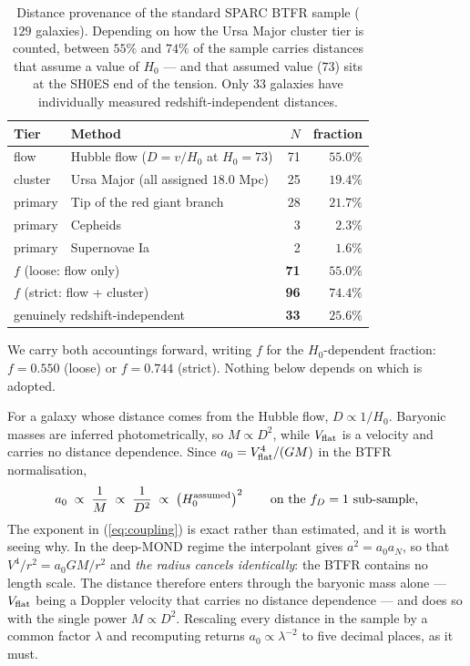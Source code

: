 \documentclass[11pt,a4paper]{article}
\begin{document}
\begin{table}[h]
\centering
\begin{tabular}{llrr}
\toprule
Tier & Method & $N$ & fraction \\
\midrule
flow    & Hubble flow ($D = v/H_0$ at $H_0 = 73$) & 71 & $55.0\%$ \\
cluster & Ursa Major (all assigned $18.0$ Mpc)    & 25 & $19.4\%$ \\
primary & Tip of the red giant branch             & 28 & $21.7\%$ \\
primary & Cepheids                                &  3 & $2.3\%$ \\
primary & Supernovae Ia                           &  2 & $1.6\%$ \\
\midrule
\multicolumn{2}{l}{$f$ (loose: flow only)}        & \textbf{71} & $\mathbf{55.0\%}$ \\
\multicolumn{2}{l}{$f$ (strict: flow + cluster)}  & \textbf{96} & $\mathbf{74.4\%}$ \\
\multicolumn{2}{l}{genuinely redshift-independent} & \textbf{33} & $25.6\%$ \\
\bottomrule
\end{tabular}
\caption{Distance provenance of the standard SPARC BTFR sample ($129$
galaxies). Depending on how the Ursa Major cluster tier is counted, between
$55\%$ and $74\%$ of the sample carries distances that assume a value of
$H_0$ --- and that assumed value ($73$) sits at the SH0ES end of the
tension. Only $33$ galaxies have individually measured redshift-independent
distances.}
\label{tab:fD}
\end{table}

We carry both accountings forward, writing $f$ for the $H_0$-dependent
fraction: $f = 0.550$ (loose) or $f = 0.744$ (strict). Nothing below depends
on which is adopted.

For a galaxy whose distance comes from the Hubble flow, $D \propto 1/H_0$.
Baryonic masses are inferred photometrically, so $M \propto D^2$, while
$V_{\rm flat}$ is a velocity and carries no distance dependence. Since
$a_0 = V_{\rm flat}^4/(GM)$ in the BTFR normalisation,
\begin{equation}
a_0 \;\propto\; \frac{1}{M} \;\propto\; \frac{1}{D^2}
\;\propto\; \left(H_0^{\rm assumed}\right)^{2}
\qquad \text{on the } f_D = 1 \text{ sub-sample,}
\label{eq:coupling}
\end{equation}
The exponent in (\ref{eq:coupling}) is exact rather than estimated, and it
is worth seeing why. In the deep-MOND regime the interpolant gives
$a^2 = a_0 a_N$, so that $V^4/r^2 = a_0 GM/r^2$ and \emph{the radius cancels
identically}: the BTFR contains no length scale. The distance therefore
enters through the baryonic mass alone --- $V_{\rm flat}$ being a Doppler
velocity that carries no distance dependence --- and does so with the single
power $M \propto D^2$. Rescaling every distance in the sample by a common
factor $\lambda$ and recomputing returns $a_0 \propto \lambda^{-2}$ to five
decimal places, as it must.
\end{document}
